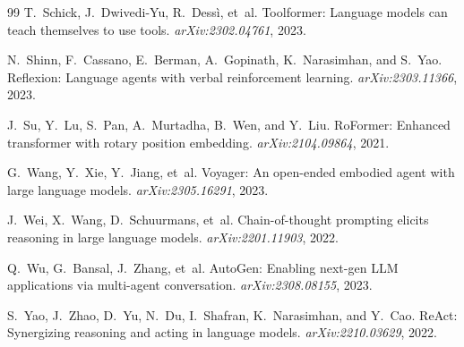\documentclass[11pt]{article}
\begin{document}
\begin{thebibliography}{99}
T.~Schick, J.~Dwivedi-Yu, R.~Dessì, et~al.
\newblock Toolformer: Language models can teach themselves to use tools.
\newblock \emph{arXiv:2302.04761}, 2023.

N.~Shinn, F.~Cassano, E.~Berman, A.~Gopinath, K.~Narasimhan, and S.~Yao.
\newblock Reflexion: Language agents with verbal reinforcement learning.
\newblock \emph{arXiv:2303.11366}, 2023.

J.~Su, Y.~Lu, S.~Pan, A.~Murtadha, B.~Wen, and Y.~Liu.
\newblock RoFormer: Enhanced transformer with rotary position embedding.
\newblock \emph{arXiv:2104.09864}, 2021.

G.~Wang, Y.~Xie, Y.~Jiang, et~al.
\newblock Voyager: An open-ended embodied agent with large language models.
\newblock \emph{arXiv:2305.16291}, 2023.

J.~Wei, X.~Wang, D.~Schuurmans, et~al.
\newblock Chain-of-thought prompting elicits reasoning in large language models.
\newblock \emph{arXiv:2201.11903}, 2022.

Q.~Wu, G.~Bansal, J.~Zhang, et~al.
\newblock AutoGen: Enabling next-gen LLM applications via multi-agent
  conversation.
\newblock \emph{arXiv:2308.08155}, 2023.

S.~Yao, J.~Zhao, D.~Yu, N.~Du, I.~Shafran, K.~Narasimhan, and Y.~Cao.
\newblock ReAct: Synergizing reasoning and acting in language models.
\newblock \emph{arXiv:2210.03629}, 2022.

\end{thebibliography}
\end{document}

